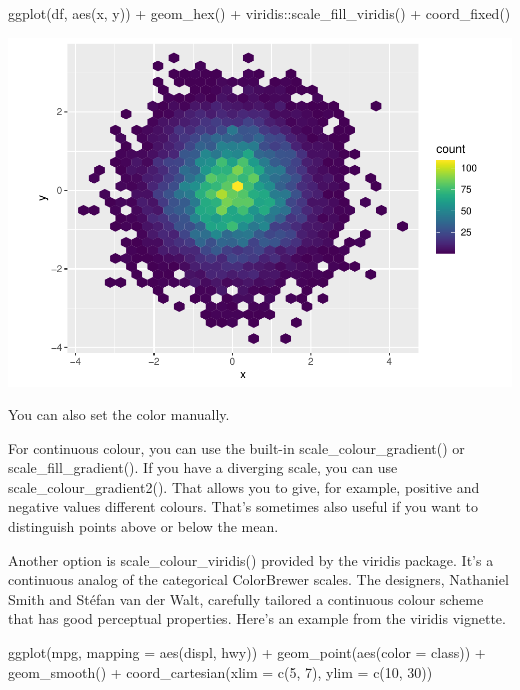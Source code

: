 \documentclass[
]{article}
\newenvironment{Shaded}{\begin{snugshade}}{\end{snugshade}}
\newcommand{\AttributeTok}[1]{\textcolor[rgb]{0.77,0.63,0.00}{#1}}
\newcommand{\DecValTok}[1]{\textcolor[rgb]{0.00,0.00,0.81}{#1}}
\newcommand{\FunctionTok}[1]{\textcolor[rgb]{0.00,0.00,0.00}{#1}}
\newcommand{\NormalTok}[1]{#1}
\newcommand{\SpecialCharTok}[1]{\textcolor[rgb]{0.00,0.00,0.00}{#1}}
\begin{document}
\begin{Shaded}
\begin{Highlighting}[]
\FunctionTok{ggplot}\NormalTok{(df, }\FunctionTok{aes}\NormalTok{(x, y)) }\SpecialCharTok{+}
  \FunctionTok{geom\_hex}\NormalTok{() }\SpecialCharTok{+}
\NormalTok{  viridis}\SpecialCharTok{::}\FunctionTok{scale\_fill\_viridis}\NormalTok{() }\SpecialCharTok{+}
  \FunctionTok{coord\_fixed}\NormalTok{()}
\end{Highlighting}
\end{Shaded}

\includegraphics{Journal_files/figure-latex/unnamed-chunk-60-3.pdf}

You can also set the color manually.

For continuous colour, you can use the built-in
scale\_colour\_gradient() or scale\_fill\_gradient(). If you have a
diverging scale, you can use scale\_colour\_gradient2(). That allows you
to give, for example, positive and negative values different colours.
That's sometimes also useful if you want to distinguish points above or
below the mean.

Another option is scale\_colour\_viridis() provided by the viridis
package. It's a continuous analog of the categorical ColorBrewer scales.
The designers, Nathaniel Smith and Stéfan van der Walt, carefully
tailored a continuous colour scheme that has good perceptual properties.
Here's an example from the viridis vignette.

\begin{Shaded}
\begin{Highlighting}[]
\FunctionTok{ggplot}\NormalTok{(mpg, }\AttributeTok{mapping =} \FunctionTok{aes}\NormalTok{(displ, hwy)) }\SpecialCharTok{+}
  \FunctionTok{geom\_point}\NormalTok{(}\FunctionTok{aes}\NormalTok{(}\AttributeTok{color =}\NormalTok{ class)) }\SpecialCharTok{+}
  \FunctionTok{geom\_smooth}\NormalTok{() }\SpecialCharTok{+}
  \FunctionTok{coord\_cartesian}\NormalTok{(}\AttributeTok{xlim =} \FunctionTok{c}\NormalTok{(}\DecValTok{5}\NormalTok{, }\DecValTok{7}\NormalTok{), }\AttributeTok{ylim =} \FunctionTok{c}\NormalTok{(}\DecValTok{10}\NormalTok{, }\DecValTok{30}\NormalTok{))}
\end{Highlighting}
\end{Shaded}
\end{document}
